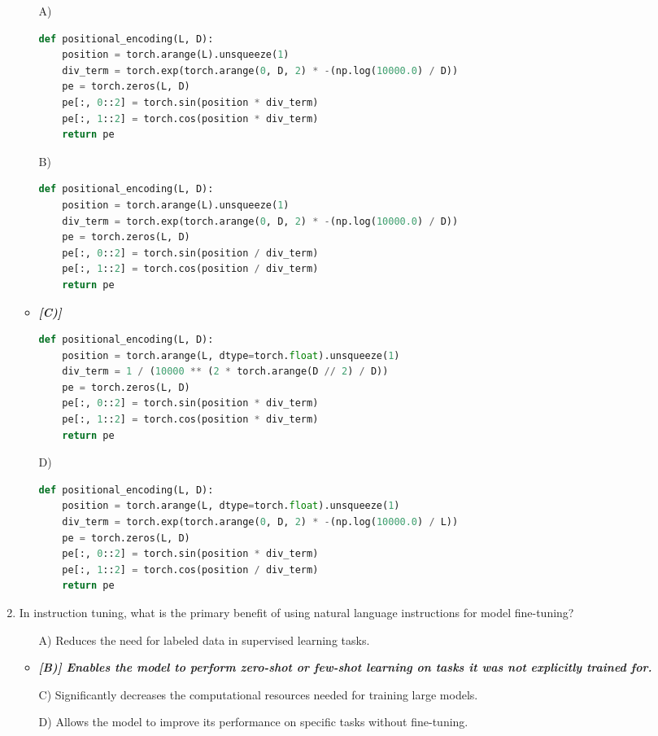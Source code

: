 \documentclass[10pt]{article}
\begin{document}
\begin{enumerate}
    \begin{itemize}
\item[A)] 
\begin{lstlisting}[language=Python]
def positional_encoding(L, D):
    position = torch.arange(L).unsqueeze(1)
    div_term = torch.exp(torch.arange(0, D, 2) * -(np.log(10000.0) / D))
    pe = torch.zeros(L, D)
    pe[:, 0::2] = torch.sin(position * div_term)
    pe[:, 1::2] = torch.cos(position * div_term)
    return pe
\end{lstlisting}

\item[B)] 
\begin{lstlisting}[language=Python]
def positional_encoding(L, D):
    position = torch.arange(L).unsqueeze(1)
    div_term = torch.exp(torch.arange(0, D, 2) * -(np.log(10000.0) / D))
    pe = torch.zeros(L, D)
    pe[:, 0::2] = torch.sin(position / div_term)
    pe[:, 1::2] = torch.cos(position / div_term)
    return pe
\end{lstlisting}



\item\textbf{\textit{[C)]}} 
\begin{lstlisting}[language=Python]
def positional_encoding(L, D):
    position = torch.arange(L, dtype=torch.float).unsqueeze(1)
    div_term = 1 / (10000 ** (2 * torch.arange(D // 2) / D))
    pe = torch.zeros(L, D)
    pe[:, 0::2] = torch.sin(position * div_term)
    pe[:, 1::2] = torch.cos(position * div_term)
    return pe
\end{lstlisting}



\item[D)] 
\begin{lstlisting}[language=Python]
def positional_encoding(L, D):
    position = torch.arange(L, dtype=torch.float).unsqueeze(1)
    div_term = torch.exp(torch.arange(0, D, 2) * -(np.log(10000.0) / L))
    pe = torch.zeros(L, D)
    pe[:, 0::2] = torch.sin(position * div_term)
    pe[:, 1::2] = torch.cos(position / div_term)
    return pe
\end{lstlisting}
        
\end{itemize}



\item In instruction tuning, what is the primary benefit of using natural language instructions for model fine-tuning?
    \begin{itemize}
        \item[A)] Reduces the need for labeled data in supervised learning tasks.
        \item\textbf{\textit{[B)] Enables the model to perform zero-shot or few-shot learning on tasks it was not explicitly trained for.}}
        \item[C)] Significantly decreases the computational resources needed for training large models.
        \item[D)] Allows the model to improve its performance on specific tasks without fine-tuning.
    \end{itemize}



\end{enumerate}
\end{document}
